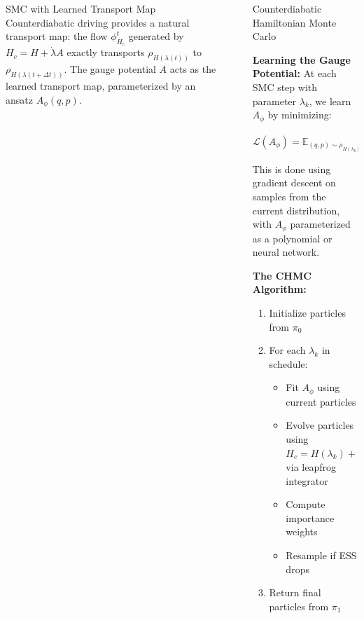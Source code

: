 \documentclass[final]{beamer}
\newlength{\sepwidth}
\newlength{\colwidth}
\newcommand{\separatorcolumn}{\begin{column}{\sepwidth}\end{column}}
\begin{document}
\begin{frame}[t]
\begin{columns}[t]
\begin{column}{\colwidth}
\begin{block}{SMC with Learned Transport Map}
Counterdiabatic driving provides a natural transport map: the flow $\phi_{H_c}^t$ generated by $H_c = H + \dot{\lambda} A$ exactly transports $\rho_{H(\lambda(t))}$ to $\rho_{H(\lambda(t+\Delta t))}$. The gauge potential $A$ acts as the learned transport map, parameterized by an ansatz $A_\phi(q,p)$.

\begin{center}
\end{center}

  \end{block}

  
  

\end{column}

\separatorcolumn

\begin{column}{\colwidth}

\begin{block}{Counterdiabatic Hamiltonian Monte Carlo}

\textbf{Learning the Gauge Potential:} At each SMC step with parameter $\lambda_k$, we learn $A_\phi$ by minimizing:

\begin{equation}
\mathcal{L}(A_\phi) = \mathbb{E}_{(q,p) \sim \rho_{H(\lambda_k)}} \left[ \left( \{A_\phi, H\} - \partial_\lambda H + \langle \partial_\lambda H \rangle \right)^2 \right]
\end{equation}

This is done using gradient descent on samples from the current distribution, with $A_\phi$ parameterized as a polynomial or neural network.

\textbf{The CHMC Algorithm:}
\begin{enumerate}
\item Initialize particles from $\pi_0$
\item For each $\lambda_k$ in schedule:
   \begin{itemize}
   \item Fit $A_\phi$ using current particles
   \item Evolve particles using $H_c = H(\lambda_k) + \dot{\lambda}_k A_\phi$ via leapfrog integrator
   \item Compute importance weights
   \item Resample if ESS drops
   \end{itemize}
\item Return final particles from $\pi_1$
\end{enumerate}


\end{block}
\end{column}
\end{columns}
\end{frame}
\end{document}
